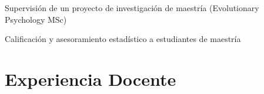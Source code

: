 \documentclass[11pt,a4paper,]{awesome-cv}
\begin{document}
\begin{cventries}
{\begin{cvitems}
\item Supervisión de un proyecto de investigación de maestría (Evolutionary Psychology MSc)
\item Calificación y asesoramiento estadístico a estudiantes de maestría
\end{cvitems}}
\end{cventries}

\hypertarget{experiencia-docente}{%
\section{Experiencia Docente}\label{experiencia-docente}}
\end{document}
